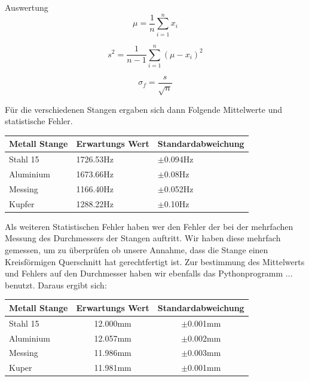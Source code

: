 \documentclass[twoside]{protokoll}
\begin{document}
\begin{aufgabe}{Auswertung}
\begin{equation}
	\mu = \frac{1}{n}\sum_{i=1}^nx_i
\end{equation}

\begin{equation}
	s^2 = \frac{1}{n-1}\sum_{i=1}^n(\mu-x_i)^2
\end{equation}

\begin{equation}
	\sigma_f = \frac{s}{\sqrt{n}} 
\end{equation}

Für die verschiedenen Stangen ergaben sich dann Folgende Mittelwerte und statistische Fehler.\\


 \begin{table}[H]
        \centering
        \begin{tabularx}{0.8\textwidth}{X X X} %
            \toprule
            \textbf{Metall Stange} & \textbf{Erwartungs Wert} & \textbf{Standardabweichung} \\
            \midrule
            Stahl 15 & 1726.53Hz & $\pm$0.094Hz \\
            Aluminium & 1673.66Hz & $\pm$0.08Hz \\
            Messing & 1166.40Hz & $\pm$0.052Hz \\
            Kupfer & 1288.22Hz & $\pm$0.10Hz \\

            \bottomrule
        \end{tabularx}
        \label{tab:mytable}
    \end{table}
    
Als weiteren Statistischen Fehler haben wer den Fehler der bei der mehrfachen Messung des Durchmessers der Stangen auftritt.
Wir haben diese mehrfach gemessen, um zu überprüfen ob unsere Annahme, dass die Stange einen 
Kreisförmigen Querschnitt hat gerechtfertigt ist. Zur bestimmung des Mittelwerts und Fehlers auf den Durchmesser 
haben wir ebenfalls das Pythonprogramm ... benutzt. 
Daraus ergibt sich:\\

 \begin{table}[H]
        \centering
        \begin{tabularx}{0.8\textwidth}{X c c} %
            \toprule
            \textbf{Metall Stange} & \textbf{Erwartungs Wert} & \textbf{Standardabweichung} \\
            \midrule
            Stahl 15 & 12.000mm & $\pm$0.001mm \\
            Aluminium & 12.057mm & $\pm$0.002mm  \\
            Messing & 11.986mm & $\pm$0.003mm \\
            Kuper & 11.981mm & $\pm$0.001mm \\
            \bottomrule
        \end{tabularx}
        \label{tab:mytable}
    \end{table}


\end{aufgabe}
\end{document}
